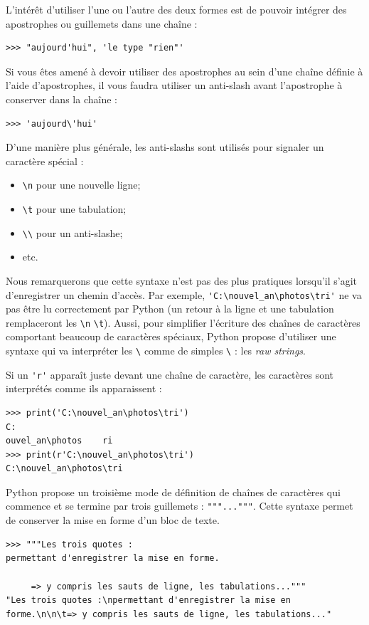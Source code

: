 \documentclass[12pt, a4paper]{article}
\begin{document}
L'intérêt d'utiliser l'une ou l'autre des deux formes est de pouvoir intégrer des apostrophes ou guillemets dans une chaîne :
\begin{lstlisting}
>>> "aujourd'hui", 'le type "rien"'
\end{lstlisting}

Si vous êtes amené à devoir utiliser des apostrophes au sein d'une chaîne définie à l'aide d'apostrophes, il vous faudra utiliser un anti-slash avant l'apostrophe à conserver dans la chaîne :
\begin{lstlisting}
>>> 'aujourd\'hui'
\end{lstlisting}

D'une manière plus générale, les anti-slashs sont utilisés pour signaler un caractère spécial :
\begin{itemize}
	\item \lstinline{\n} pour une nouvelle ligne;
	\item \lstinline{\t} pour une tabulation;
	\item \lstinline{\\} pour un anti-slashe;
	\item etc.
\end{itemize}

Nous remarquerons que cette syntaxe n'est pas des plus pratiques lorsqu'il s'agit d'enregistrer un chemin d'accès. Par exemple, \lstinline{'C:\nouvel_an\photos\tri'} ne va pas être lu correctement par Python (un retour à la ligne et une tabulation remplaceront les \lstinline{\n} \lstinline{\t}). Aussi, pour simplifier l'écriture des chaînes de caractères comportant beaucoup de caractères spéciaux, Python propose d'utiliser une syntaxe qui va interpréter les \lstinline{\} comme de simples \lstinline{\} : les \textit{raw strings}.

Si un \lstinline{'r'} apparaît juste devant une chaîne de caractère, les caractères sont interprétés comme ils apparaissent :
\begin{lstlisting}
>>> print('C:\nouvel_an\photos\tri')
C:
ouvel_an\photos    ri
>>> print(r'C:\nouvel_an\photos\tri')
C:\nouvel_an\photos\tri
\end{lstlisting}

Python propose un troisième mode de définition de chaînes de caractères qui commence et se termine par trois guillemets : \lstinline{"""..."""}. Cette syntaxe permet de conserver la mise en forme d'un bloc de texte.
\begin{lstlisting}
>>> """Les trois quotes :
permettant d'enregistrer la mise en forme.

     => y compris les sauts de ligne, les tabulations..."""
"Les trois quotes :\npermettant d'enregistrer la mise en forme.\n\n\t=> y compris les sauts de ligne, les tabulations..."
\end{lstlisting}
\end{document}
